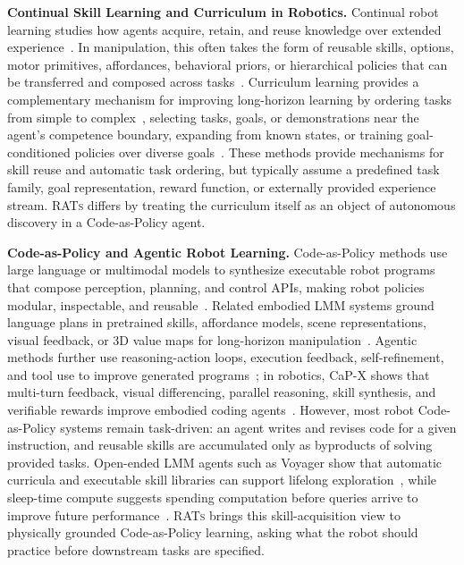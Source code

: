 \textbf{Continual Skill Learning and Curriculum in Robotics.}
Continual robot learning studies how agents acquire, retain, and reuse knowledge over extended experience~\citep{thrun1995lifelong, parisi2019continual, lesort2020continual}. In manipulation, this often takes the form of reusable skills, options, motor primitives, affordances, behavioral priors, or hierarchical policies that can be transferred and composed across tasks~\citep{sutton1999between, konidaris2012robot, kroemer2021review, pertsch2020long, lynch2021language, wan2024lotuscontinualimitationlearning, ma2024dreureka}. Curriculum learning provides a complementary mechanism for improving long-horizon learning by ordering tasks from simple to complex~\citep{bengio2009curriculum, narvekar2020curriculum}, selecting tasks, goals, or demonstrations near the agent's competence boundary, expanding from known states, or training goal-conditioned policies over diverse goals~\citep{florensa2018automatic, nair2018visual, pong2020skewfit, colas2020language, seita2019zpd}. These methods provide mechanisms for skill reuse and automatic task ordering, but typically assume a predefined task family, goal representation, reward function, or externally provided experience stream. \textsc{RATs} differs by treating the curriculum itself as an object of autonomous discovery in a Code-as-Policy agent.


\textbf{Code-as-Policy and Agentic Robot Learning.}
Code-as-Policy methods use large language or multimodal models to synthesize executable robot programs that compose perception, planning, and control APIs, making robot policies modular, inspectable, and reusable~\citep{liang2023code, singh2023progprompt, vemprala2024chatgpt, mu2024robocodexmultimodalcodegeneration, geminirobotics1d52025, shi2025maestro}. Related embodied LMM systems ground language plans in pretrained skills, affordance models, scene representations, visual feedback, or 3D value maps for long-horizon manipulation~\citep{ahn2022saycan, driess2023palme, huang2023voxposer, zeng2023socratic, mu2023embodied}. Agentic methods further use reasoning-action loops, execution feedback, self-refinement, and tool use to improve generated programs~\citep{yao2023react, shinn2023reflexion, madaan2023selfrefine, chen2024selfdebug}; in robotics, CaP-X shows that multi-turn feedback, visual differencing, parallel reasoning, skill synthesis, and verifiable rewards improve embodied coding agents~\citep{fu2026capx}. However, most robot Code-as-Policy systems remain task-driven: an agent writes and revises code for a given instruction, and reusable skills are accumulated only as byproducts of solving provided tasks. Open-ended LMM agents such as Voyager show that automatic curricula and executable skill libraries can support lifelong exploration~\citep{wang2023voyager}, while sleep-time compute suggests spending computation before queries arrive to improve future performance~\citep{lin2025sleeptime}. \textsc{RATs} brings this skill-acquisition view to physically grounded Code-as-Policy learning, asking what the robot should practice before downstream tasks are specified.


